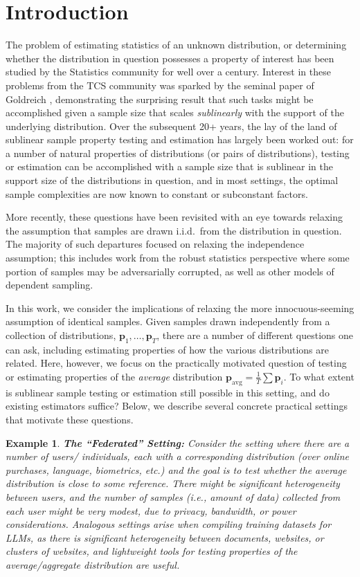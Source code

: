 \documentclass[10pt]{article} %
\theoremstyle{plain}
\newtheorem{example}[theorem]{Example}
\newcommand{\bp}{\textbf{p}}
\newcommand{\avg}{\mathrm{avg}}
\begin{document}
\section{Introduction}
\label{sec:intro}

The problem of estimating statistics of an unknown distribution, or determining whether the distribution in question possesses a property of interest has been studied by the Statistics community for well over a century.  Interest in these problems from the TCS community was sparked by the seminal paper of Goldreich \citep{goldreich2011testing}, demonstrating the surprising result that such tasks might be accomplished given a sample size that scales \emph{sublinearly} with the support of the underlying distribution.  Over the subsequent 20+ years, the lay of the land of sublinear sample property testing and estimation has largely been worked out: for a number of natural properties of distributions (or pairs of distributions), testing or estimation can be accomplished with a sample size that is sublinear in the support size of the distributions in question, and in most settings, the optimal sample complexities are now known to constant or subconstant factors. 

More recently, these questions have been revisited with an eye towards relaxing the assumption that samples are drawn i.i.d.\ from the distribution in question.  The majority of such departures focused on relaxing the independence assumption; this includes work from the robust statistics perspective where some portion of samples may be adversarially corrupted, as well as other models of dependent sampling.  

In this work, we consider the implications of relaxing the more innocuous-seeming assumption of identical samples.  Given samples drawn independently from a collection of distributions, $\bp_1,\ldots,\bp_T$, there are a number of different questions one can ask, including estimating properties of how the various distributions are related.  Here, however, we focus on the practically motivated question of testing or estimating properties of the \emph{average} distribution $\bp_{\avg} = \frac{1}{T}\sum \bp_i.$  To what extent is sublinear sample testing or estimation still possible in this setting, and do existing estimators suffice?  Below, we describe several concrete practical settings that motivate these questions.

\begin{example}
	\textbf{The ``Federated'' Setting:} Consider the setting where there are a number of users/ individuals, each with a corresponding distribution (over online purchases, language, biometrics, etc.) and the goal is to test whether the average distribution is close to some reference.  There might be significant heterogeneity between users, and the number of samples (i.e., amount of data) collected from each user might be very modest,  due to privacy, bandwidth, or power considerations.  Analogous settings arise when compiling training datasets for LLMs, as there is significant heterogeneity between documents, websites, or clusters of websites, and lightweight tools for testing properties of the average/aggregate distribution are useful.
\end{example}
\end{document}
